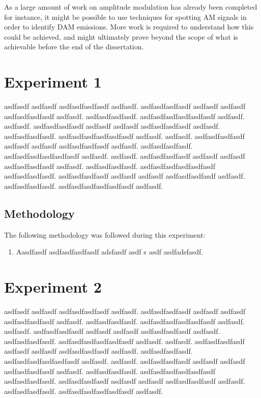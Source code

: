 \documentclass[runningheads,a4paper]{llncs}
\begin{document}
As a large amount of work on amplitude modulation has already been completed for instance, it might be possible to use techniques for spotting AM signals in order to identify \gls{DAM} emissions. More work is required to understand how this could be achieved, and might ultimately prove beyond the scope of what is achievable before the end of the dissertation.

\section*{Experiment 1}
asdfasdf asdfasdf asdfasdfasdfasdf asdfasdf. asdfasdfasdfasdf asdfasdf asdfasdf asdfasdfasdfasdf asdfasdf. asdfasdfasdfasdf. asdfasdfasdfasdfasdfasdf asdfasdf. asdfasdf. asdfasdfasdfasdf asdfasdf asdfasdf asdfasdfasdfasdf asdfasdf. asdfasdfasdfasdf. asdfasdfasdfasdfasdfasdf asdfasdf. asdfasdf. asdfasdfasdfasdf asdfasdf asdfasdf asdfasdfasdfasdf asdfasdf. asdfasdfasdfasdf. asdfasdfasdfasdfasdfasdf asdfasdf. asdfasdf. asdfasdfasdfasdf asdfasdf asdfasdf asdfasdfasdfasdf asdfasdf. asdfasdfasdfasdf. asdfasdfasdfasdfasdfasdf asdfasdfasdfasdf. asdfasdfasdfasdf asdfasdf asdfasdf asdfasdfasdfasdf asdfasdf. asdfasdfasdfasdf. asdfasdfasdfasdfasdfasdf asdfasdf.


\subsection*{Methodology}
The following methodology was followed during this experiment:

\begin{enumerate}
	\item Aasdfasdf asdfasdfasdfasdf adsfasdf asdf s asdf  asdfadsfasdf. 
\end{enumerate}


\section*{Experiment 2}
asdfasdf asdfasdf asdfasdfasdfasdf asdfasdf. asdfasdfasdfasdf asdfasdf asdfasdf asdfasdfasdfasdf asdfasdf. asdfasdfasdfasdf. asdfasdfasdfasdfasdfasdf asdfasdf. asdfasdf. asdfasdfasdfasdf asdfasdf asdfasdf asdfasdfasdfasdf asdfasdf. asdfasdfasdfasdf. asdfasdfasdfasdfasdfasdf asdfasdf. asdfasdf. asdfasdfasdfasdf asdfasdf asdfasdf asdfasdfasdfasdf asdfasdf. asdfasdfasdfasdf. asdfasdfasdfasdfasdfasdf asdfasdf. asdfasdf. asdfasdfasdfasdf asdfasdf asdfasdf asdfasdfasdfasdf asdfasdf. asdfasdfasdfasdf. asdfasdfasdfasdfasdfasdf asdfasdfasdfasdf. asdfasdfasdfasdf asdfasdf asdfasdf asdfasdfasdfasdf asdfasdf. asdfasdfasdfasdf. asdfasdfasdfasdfasdfasdf asdfasdf.
\end{document}
